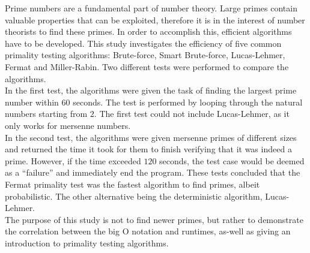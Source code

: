 \documentclass[main.tex]{subfiles}
\begin{document}
Prime numbers are a fundamental part of number theory. Large primes contain
valuable properties that can be exploited, therefore it is in the interest of
number theorists to find these primes. In order to accomplish this, efficient
algorithms have to be developed. This study investigates the efficiency of five
common primality testing algorithms: Brute-force, Smart Brute-force,
Lucas-Lehmer, Fermat and Miller-Rabin. Two different tests were performed to
compare the algorithms. \\

In the first test, the algorithms were given the task of finding the largest
prime number within $60$ seconds. The test is performed by looping through the
natural numbers starting from $2$. The first test could not include
Lucas-Lehmer, as it only works for mersenne numbers. \\

In the second test, the algorithms were given mersenne primes of different sizes
and returned the time it took for them to finish verifying that it was indeed a
prime. However, if the time exceeded $120$ seconds, the test case would be
deemed as a ``failure'' and immediately end the program. These tests concluded
that the Fermat primality test was the fastest algorithm to find primes, albeit
probabilistic. The other alternative being the deterministic algorithm, Lucas-Lehmer. \\

The purpose of this study is not to find newer primes, but rather to demonstrate
the correlation between the big O notation and runtimes, as-well as giving an
introduction to primality testing algorithms. \\
\end{document}
